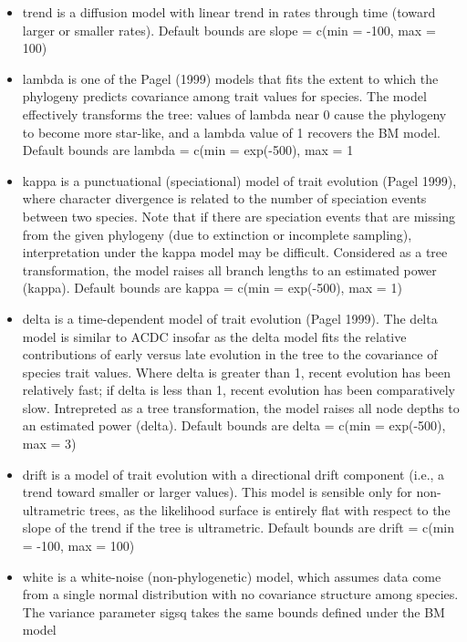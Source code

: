 \documentclass[10pt,landscape]{article}
\begin{document}
\begin{CJK}{UTF8}{gbsn}
\begin{multicols}{3}
\begin{itemize}
\item trend is a diffusion model with linear trend in rates through time (toward larger or smaller rates). Default bounds are slope = c(min = -100, max = 100)

\item lambda is one of the Pagel (1999) models that fits the extent to which the phylogeny predicts covariance among trait values for species. The model effectively transforms the tree: values of lambda near 0 cause the phylogeny to become more star-like, and a lambda value of 1 recovers the BM model. Default bounds are lambda = c(min = exp(-500), max = 1

\item kappa is a punctuational (speciational) model of trait evolution (Pagel 1999), where character divergence is related to the number of speciation events between two species. Note that if there are speciation events that are missing from the given phylogeny (due to extinction or incomplete sampling), interpretation under the kappa model may be difficult. Considered as a tree transformation, the model raises all branch lengths to an estimated power (kappa). Default bounds are kappa = c(min = exp(-500), max = 1)

\item delta is a time-dependent model of trait evolution (Pagel 1999). The delta model is similar to ACDC insofar as the delta model fits the relative contributions of early versus late evolution in the tree to the covariance of species trait values. Where delta is greater than 1, recent evolution has been relatively fast; if delta is less than 1, recent evolution has been comparatively slow. Intrepreted as a tree transformation, the model raises all node depths to an estimated power (delta). Default bounds are delta = c(min = exp(-500), max = 3)

\item drift is a model of trait evolution with a directional drift component (i.e., a trend toward smaller or larger values). This model is sensible only for non-ultrametric trees, as the likelihood surface is entirely flat with respect to the slope of the trend if the tree is ultrametric. Default bounds are drift = c(min = -100, max = 100)

\item white is a white-noise (non-phylogenetic) model, which assumes data come from a single normal distribution with no covariance structure among species. The variance parameter sigsq takes the same bounds defined under the BM model


\end{itemize}
\end{multicols}
\end{CJK}
\end{document}
